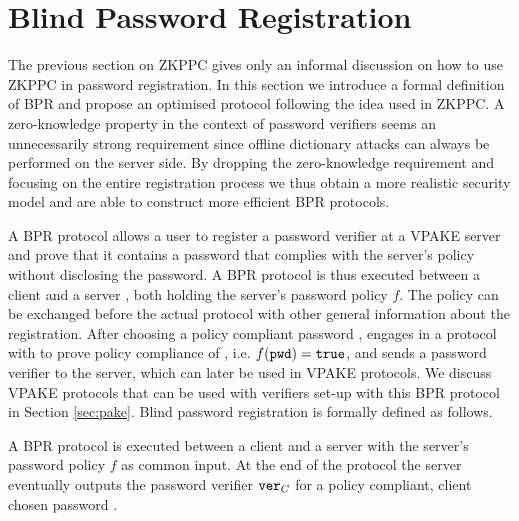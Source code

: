 \section{Blind Password Registration} \label{sec:bpr}

The previous section on \ac{ZKPPC} gives only an informal discussion on how to use \ac{ZKPPC} in password registration.
In this section we introduce a formal definition of \ac{BPR} and propose an optimised protocol following the idea used in \ac{ZKPPC}.
A zero-knowledge property in the context of password verifiers seems an unnecessarily strong requirement since offline dictionary attacks can always be performed on the server side.
By dropping the zero-knowledge requirement and focusing on the entire registration process we thus obtain a more realistic security model and are able to construct more efficient \ac{BPR} protocols.

A \ac{BPR} protocol allows a user to register a password verifier at a \ac{VPAKE} server and prove that it contains a password that complies with the server's policy without disclosing the password.
A \ac{BPR} protocol is thus executed between a client \Client and a server \Server, both holding the server's password policy $f$.
The policy can be exchanged before the actual protocol with other general information about the registration.
After choosing a policy compliant password \pwd, \Client engages in a protocol with \Server to prove policy compliance of \pwd, i.e. $f(\mathtt{pwd})=\mathtt{true}$, and sends a password verifier to the server, which can later be used in \ac{VPAKE} protocols.
We discuss \ac{VPAKE} protocols that can be used with verifiers set-up with this \ac{BPR} protocol in Section \ref{sec:pake}.
Blind password registration is formally defined as follows.

\begin{definition}\label{def:bpr}
A \ac{BPR} protocol is executed between a client \Client and a server \Server with the server's password policy $f$ as common input. 
At the end of the protocol the server eventually outputs the password verifier $\mathtt{ver}_C$ for a policy compliant, client chosen password \pwd. %
\eod
\end{definition}

